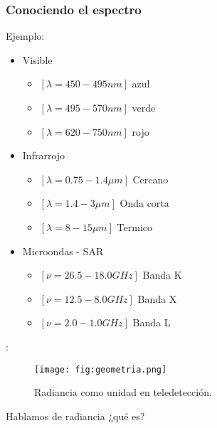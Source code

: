 \begin{frame}
  \frametitle{Conociendo el espectro}
  \begin{exampleblock}{Ejemplo:}
    \begin{itemize}
      \item<1,4> Visible
      \begin{itemize}
        \item<1,4> $[\lambda=450-495 nm]$ {\color{blue} azul}
        \item<1,4> $[\lambda=495-570 nm]$ {\color{green} verde}
        \item<1,4> $[\lambda=620-750 nm]$ {\color{red} rojo}
      \end{itemize}
      \item<2,4> Infrarrojo
      \begin{itemize}
        \item<2,4> $[\lambda=0.75-1.4\mu m]$ Cercano
        \item<2,4> $[\lambda=1.4-3\mu m]$ Onda corta
        \item<2,4> $[\lambda=8-15\mu m]$ Termico
      \end{itemize}
      \item<3,4> Microondas - SAR
      \begin{itemize}
        \item<3,4> $[\nu = 26.5 -18.0 GHz]$ Banda K
        \item<3,4> $[\nu = 12.5 - 8.0 GHz]$ Banda X
        \item<3,4> $[\nu = 2.0 - 1.0 GHz] $ Banda L
      \end{itemize}
    \end{itemize}
  \end{exampleblock}
\end{frame}


\begin{frame}{\secname : \subsecname}
  \begin{figure}
    \centering
    \texttt{[image: fig:geometria.png]}
    \caption{Radiancia como unidad en teledetección.}
    \label{}
  \end{figure}
\end{frame}
\begin {frame}
\begin{block}{Hablamos de radiancia}
      ¿qué es?
               \end{block}
\end{frame}

